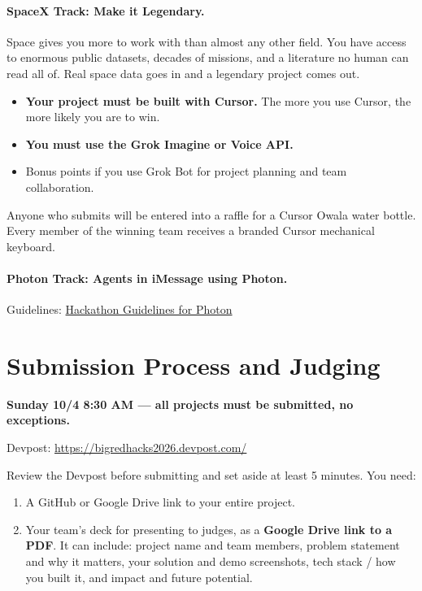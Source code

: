 \documentclass[11pt]{article}
\newcommand{\important}[1]{\textbf{\color{bigred}#1}}
\begin{document}
\paragraph{SpaceX Track: Make it Legendary.}
Space gives you more to work with than almost any other field. You have access
to enormous public datasets, decades of missions, and a literature no human can
read all of. Real space data goes in and a legendary project comes out.
\begin{itemize}
  \item \important{Your project must be built with Cursor.} The more you use
        Cursor, the more likely you are to win.
  \item \important{You must use the Grok Imagine or Voice API.}
  \item Bonus points if you use Grok Bot for project planning and team collaboration.
\end{itemize}
Anyone who submits will be entered into a raffle for a Cursor Owala water
bottle. Every member of the winning team receives a branded Cursor mechanical
keyboard.

\paragraph{Photon Track: Agents in iMessage using Photon.}
Guidelines:
\href{https://somethingreat.notion.site/Hackathon-Guidelines-for-Photon-3dce443f36bb803696daf4135f063cd1}{Hackathon Guidelines for Photon}

\section{Submission Process and Judging}
\important{Sunday 10/4 8:30 AM --- all projects must be submitted, no exceptions.}

\noindent Devpost: \url{https://bigredhacks2026.devpost.com/}

\medskip
Review the Devpost before submitting and set aside at least 5 minutes. You need:
\begin{enumerate}
  \item A GitHub or Google Drive link to your entire project.
  \item Your team's deck for presenting to judges, as a \textbf{Google Drive link to a PDF}.
        It can include: project name and team members, problem statement and why
        it matters, your solution and demo screenshots, tech stack / how you built
        it, and impact and future potential.
\end{enumerate}
\end{document}
